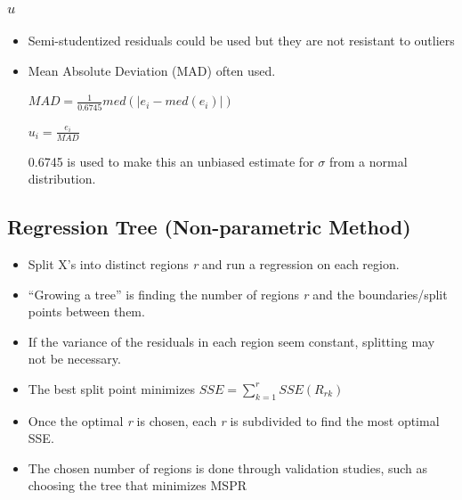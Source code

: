 \documentclass[11pt]{article}
\begin{document}
\subsubsection{\(u\)}
\label{sec:orgea83f6c}
\begin{itemize}
\item Semi-studentized residuals could be used but they are not resistant to
outliers
\item Mean Absolute Deviation (MAD) often used.

\(MAD = \frac{1}{0.6745} med (|e_i - med (e_i)|)\)

\(u_i = \frac{e_i}{MAD}\)

0.6745 is used to make this an unbiased estimate for \(\sigma\) from a normal distribution.
\end{itemize}

\subsection{Regression Tree (Non-parametric Method)}
\label{sec:org622825e}
\begin{itemize}
\item Split X's into distinct regions \emph{r} and run a regression on each region.
\item ``Growing a tree'' is finding the number of regions \emph{r} and the boundaries/split
points between them.
\item If the variance of the residuals in each region seem constant, splitting may
not be necessary.
\item The best split point minimizes \(SSE = \sum_{k = 1}^{r} SSE (R_{rk})\)
\item Once the optimal \emph{r} is chosen, each \emph{r} is subdivided to find the most
optimal SSE.
\item The chosen number of regions is done through validation studies, such as
choosing the tree that minimizes MSPR
\end{itemize}
\end{document}
